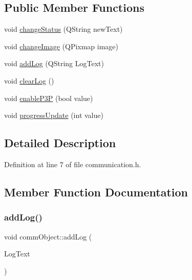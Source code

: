 \subsection*{Public Member Functions}
\begin{DoxyCompactItemize}
\item 
void \hyperlink{classcomm_object_a1f4b8dd22ecc46bab619f6b1fe1a5144}{change\+Status} (Q\+String new\+Text)
\item 
void \hyperlink{classcomm_object_a6f81522c2aa1668fa402f08710e6206b}{change\+Image} (Q\+Pixmap image)
\item 
void \hyperlink{classcomm_object_aec354c7099b3039083cc4224e071e022}{add\+Log} (Q\+String Log\+Text)
\item 
void \hyperlink{classcomm_object_a785f776d16f1871786bb88482fc4dd1f}{clear\+Log} ()
\item 
void \hyperlink{classcomm_object_a7552116eb5e18c49c6dcf943de29af7a}{enable\+P3P} (bool value)
\item 
void \hyperlink{classcomm_object_acfc97f4310e2b7d841ecb8cf8be0088e}{progress\+Update} (int value)
\end{DoxyCompactItemize}


\subsection{Detailed Description}


Definition at line 7 of file communication.\+h.



\subsection{Member Function Documentation}
\mbox{\label{classcomm_object_aec354c7099b3039083cc4224e071e022}} 
\subsubsection{\texorpdfstring{add\+Log()}{addLog()}}
{\footnotesize\ttfamily void comm\+Object\+::add\+Log (\begin{DoxyParamCaption}\item[{Q\+String}]{Log\+Text }\end{DoxyParamCaption})}



